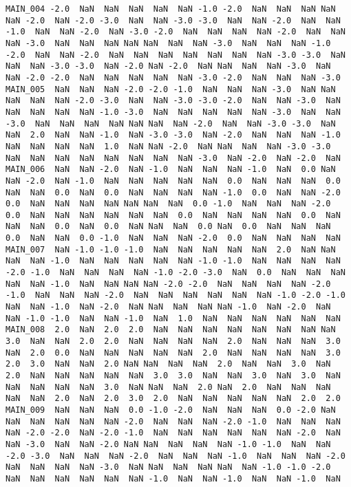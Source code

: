 \documentclass[a4paper,10pt,onecolumn,oneside,openright]{article}
\begin{document}
\begin{verbatim}
MAIN_004 -2.0  NaN  NaN  NaN  NaN  NaN -1.0 -2.0  NaN  NaN  NaN NaN  NaN -2.0  NaN -2.0 -3.0  NaN  NaN -3.0 -3.0  NaN  NaN -2.0  NaN  NaN -1.0  NaN  NaN -2.0  NaN -3.0 -2.0  NaN  NaN  NaN  NaN -2.0  NaN  NaN  NaN -3.0  NaN  NaN  NaN NaN NaN  NaN  NaN -3.0  NaN  NaN  NaN -1.0 -2.0  NaN  NaN -2.0  NaN  NaN  NaN  NaN  NaN  NaN  NaN -3.0 -3.0  NaN NaN  NaN -3.0 -3.0  NaN -2.0 NaN -2.0  NaN NaN  NaN  NaN -3.0  NaN  NaN -2.0 -2.0  NaN  NaN  NaN  NaN  NaN -3.0 -2.0  NaN  NaN  NaN -3.0
MAIN_005  NaN  NaN  NaN -2.0 -2.0 -1.0  NaN  NaN  NaN -3.0  NaN NaN  NaN  NaN  NaN -2.0 -3.0  NaN  NaN -3.0 -3.0 -2.0  NaN  NaN -3.0  NaN  NaN  NaN  NaN  NaN -1.0 -3.0  NaN  NaN  NaN  NaN  NaN -3.0  NaN  NaN -3.0  NaN  NaN  NaN  NaN NaN NaN  NaN -2.0  NaN  NaN -3.0 -3.0  NaN  NaN  2.0  NaN  NaN -1.0  NaN -3.0 -3.0  NaN -2.0  NaN  NaN  NaN -1.0 NaN  NaN  NaN  NaN  1.0  NaN NaN -2.0  NaN NaN  NaN  NaN -3.0 -3.0  NaN  NaN  NaN  NaN  NaN  NaN  NaN  NaN -3.0  NaN -2.0  NaN -2.0  NaN
MAIN_006  NaN  NaN -2.0  NaN -1.0  NaN  NaN  NaN -1.0  NaN  0.0 NaN  NaN -2.0  NaN -1.0  NaN  NaN  NaN  NaN  NaN  0.0  NaN  NaN  NaN  0.0  NaN  NaN  0.0  NaN  0.0  NaN  NaN  NaN  NaN -1.0  0.0  NaN  NaN -2.0  0.0  NaN  NaN  NaN  NaN NaN NaN  NaN  0.0 -1.0  NaN  NaN  NaN -2.0  0.0  NaN  NaN  NaN  NaN  NaN  NaN  0.0  NaN  NaN  NaN  NaN  0.0  NaN NaN  NaN  0.0  NaN  0.0  NaN NaN  NaN  0.0 NaN  0.0  NaN  NaN  NaN  0.0  NaN  NaN  0.0 -1.0  NaN  NaN  NaN -2.0  0.0  NaN  NaN  NaN  NaN
MAIN_007  NaN -1.0 -1.0 -1.0  NaN  NaN  NaN  NaN  NaN  2.0  NaN NaN  NaN  NaN -1.0  NaN  NaN  NaN  NaN  NaN -1.0 -1.0  NaN  NaN  NaN  NaN -2.0 -1.0  NaN  NaN  NaN  NaN -1.0 -2.0 -3.0  NaN  0.0  NaN  NaN  NaN  NaN  NaN -1.0  NaN  NaN NaN NaN -2.0 -2.0  NaN  NaN  NaN  NaN -2.0 -1.0  NaN  NaN  NaN -2.0  NaN  NaN  NaN  NaN  NaN  NaN -1.0 -2.0 -1.0 NaN  NaN -1.0  NaN -2.0  NaN NaN  NaN  NaN NaN -1.0  NaN -2.0  NaN  NaN -1.0 -1.0  NaN  NaN -1.0  NaN  1.0  NaN  NaN  NaN  NaN  NaN  NaN
MAIN_008  2.0  NaN  2.0  2.0  NaN  NaN  NaN  NaN  NaN  NaN  NaN NaN  3.0  NaN  NaN  2.0  2.0  NaN  NaN  NaN  NaN  2.0  NaN  NaN  NaN  3.0  NaN  2.0  0.0  NaN  NaN  NaN  NaN  NaN  2.0  NaN  NaN  NaN  NaN  3.0  2.0  3.0  NaN  NaN  2.0 NaN NaN  NaN  NaN  2.0  NaN  NaN  3.0  NaN  2.0  NaN  NaN  NaN  NaN  NaN  3.0  3.0  NaN  NaN  3.0  NaN  3.0  NaN NaN  NaN  NaN  NaN  3.0  NaN NaN  NaN  2.0 NaN  2.0  NaN  NaN  NaN  NaN  NaN  2.0  NaN  2.0  3.0  2.0  NaN  NaN  NaN  NaN  NaN  2.0  2.0
MAIN_009  NaN  NaN  NaN  0.0 -1.0 -2.0  NaN  NaN  NaN  0.0 -2.0 NaN  NaN  NaN  NaN  NaN  NaN -2.0  NaN  NaN  NaN -2.0 -1.0  NaN  NaN  NaN  NaN -2.0 -2.0  NaN -2.0 -1.0  NaN  NaN  NaN  NaN  NaN  NaN -2.0  NaN  NaN -3.0  NaN  NaN -2.0 NaN NaN  NaN  NaN  NaN -1.0 -1.0  NaN  NaN -2.0 -3.0  NaN  NaN  NaN -2.0  NaN  NaN  NaN -1.0  NaN  NaN  NaN -2.0 NaN  NaN  NaN  NaN -3.0  NaN NaN  NaN  NaN NaN  NaN -1.0 -1.0 -2.0  NaN  NaN  NaN  NaN  NaN  NaN -1.0  NaN  NaN -1.0  NaN  NaN -1.0  NaN

\end{verbatim}
\end{document}
